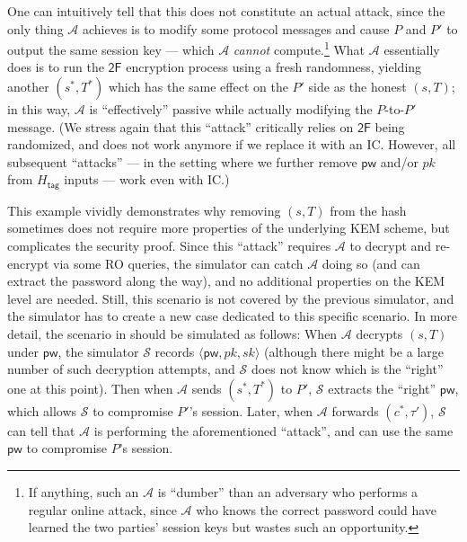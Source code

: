 \documentclass{article}
\theoremstyle{plain}
\theoremstyle{definition}
\theoremstyle{remark}
\newcommand{\adv}{\mathcal{A}}
\renewcommand{\sim}{\mathcal{S}}
\newcommand{\Htag}{H_\mathsf{tag}}
\newcommand{\pw}{\mathsf{pw}}
\begin{document}
One can intuitively tell that this does not constitute an actual attack, since the only thing $\adv$ achieves is to modify some protocol messages and cause $P$ and $P'$ to output the same session key --- which $\adv$ \emph{cannot} compute.\footnote{If anything, such an $\adv$ is ``dumber'' than an adversary who performs a regular online attack, since $\adv$ who knows the correct password could have learned the two parties' session keys but wastes such an opportunity.} What $\adv$ essentially does is to run the $\mathsf{2F}$ encryption process using a fresh randomness, yielding another $(s^*,T^*)$ which has the same effect on the $P'$ side as the honest $(s,T)$; in this way, $\adv$ is ``effectively'' passive while actually modifying the $P$-to-$P'$ message. (We stress again that this ``attack'' critically relies on $\mathsf{2F}$ being randomized, and does not work anymore if we replace it with an IC. However, all subsequent ``attacks'' --- in the setting where we further remove $\pw$ and/or $pk$ from $\Htag$ inputs --- work even with IC.)

This example vividly demonstrates why removing $(s,T)$ from the hash sometimes does not require more properties of the underlying KEM scheme, but complicates the security proof. Since this ``attack'' requires $\adv$ to decrypt and re-encrypt via some RO queries, the simulator can catch $\adv$ doing so (and can extract the password along the way), and no additional properties on the KEM level are needed. Still, this scenario is not covered by the previous simulator, and the simulator has to create a new case dedicated to this specific scenario. In more detail, the scenario in  should be simulated as follows: When $\adv$ decrypts $(s,T)$ under $\pw$, the simulator $\sim$ records $\langle\pw,pk,sk\rangle$ (although there might be a large number of such decryption attempts, and $\sim$ does not know which is the ``right'' one at this point). Then when $\adv$ sends $(s^*,T^*)$ to $P'$, $\sim$ extracts the ``right'' $\pw$, which allows $\sim$ to compromise $P'$'s session. Later, when $\adv$ forwards $(c^*,\tau')$, $\sim$ can tell that $\adv$ is performing the aforementioned ``attack'', and can use the same $\pw$ to compromise $P$'s session.
\end{document}
